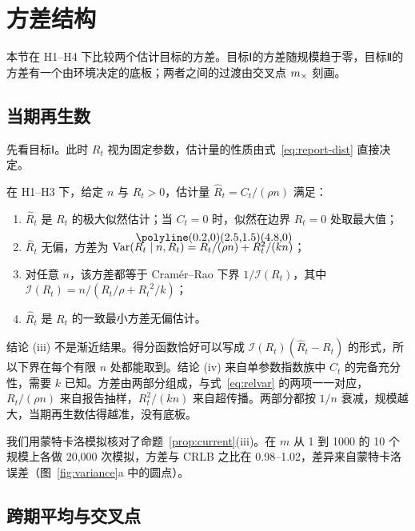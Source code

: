 \section{方差结构}
\label{sec:variance}

本节在 H1--H4 下比较两个估计目标的方差。目标Ⅰ的方差随规模趋于零，目标Ⅱ的方差有一个由环境决定的底板；两者之间的过渡由交叉点 $m_{\times}$ 刻画。

\subsection{当期再生数}
\label{sec:variance-current}

先看目标Ⅰ。此时 $R_t$ 视为固定参数，估计量的性质由式~\eqref{eq:report-dist} 直接决定。

\begin{proposition}[当期再生数的有效估计]
\label{prop:current}
在 H1--H3 下，给定 $n$ 与 $R_t>0$，估计量 $\widehat R_t=C_t/(\rho n)$ 满足：
\begin{enumerate}[label=(\roman*)]
  \item $\widehat R_t$ 是 $R_t$ 的极大似然估计；当 $C_t=0$ 时，似然在边界 $R_t=0$ 处取最大值；
  \item $\widehat R_t$ 无偏，方差为 $\Var(\widehat R_t\mid n,R_t)=R_t/(\rho n)+R_t^2/(kn)$；
  \item 对任意 $n$，该方差都等于 Cramér--Rao 下界 $1/\mathcal I(R_t)$，其中 $\mathcal I(R_t)=n/(R_t/\rho+{R_t}^2/k)$；
  \item $\widehat R_t$ 是 $R_t$ 的一致最小方差无偏估计。
\end{enumerate}
\end{proposition}

结论 (iii) 不是渐近结果。得分函数恰好可以写成 $\mathcal I(R_t)(\widehat R_t-R_t)$ 的形式，所以下界在每个有限 $n$ 处都能取到。结论 (iv) 来自单参数指数族中 $C_t$ 的完备充分性，需要 $k$ 已知\citep{lehmann1998point, casella2002statistical}。方差由两部分组成，与式~\eqref{eq:relvar} 的两项一一对应，$R_t/(\rho n)$ 来自报告抽样，$R_t^2/(kn)$ 来自超传播。两部分都按 $1/n$ 衰减，规模越大，当期再生数估得越准，没有底板。

我们用蒙特卡洛模拟核对了命题~\ref{prop:current}(iii)。在 $m$ 从 1 到 1000 的 10 个规模上各做 20,000 次模拟，方差与 CRLB 之比在 0.98--1.02，差异来自蒙特卡洛误差（图~\ref{fig:variance}a 中的圆点）。

\subsection{跨期平均与交叉点}
\label{sec:variance-crossover}

